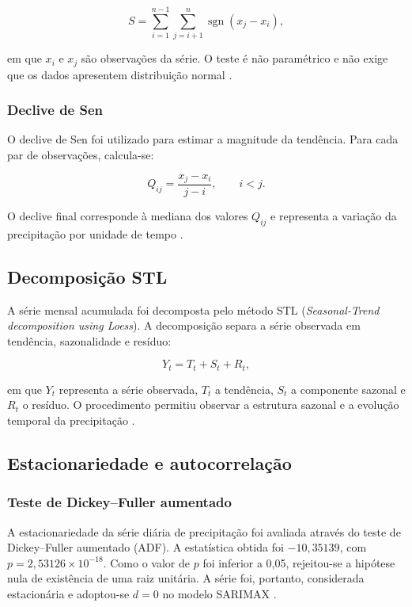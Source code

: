 \documentclass[9pt,twocolumn,twoside,english,portuguese]{opticajnl}
\begin{document}
\[
S=\sum_{i=1}^{n-1}\sum_{j=i+1}^{n}
\operatorname{sgn}(x_j-x_i),
\]

em que $x_i$ e $x_j$ são observações da série. O teste é não paramétrico e
não exige que os dados apresentem distribuição normal
\cite{mann1945nonparametric,kendall1975rank}.

\subsubsection{Declive de Sen}

O declive de Sen foi utilizado para estimar a magnitude da tendência. Para
cada par de observações, calcula-se:

\[
Q_{ij}=\frac{x_j-x_i}{j-i}, \qquad i<j.
\]

O declive final corresponde à mediana dos valores $Q_{ij}$ e representa a
variação da precipitação por unidade de tempo
\cite{sen1968estimates}.

\subsection{Decomposição STL}

A série mensal acumulada foi decomposta pelo método STL
(\textit{Seasonal-Trend decomposition using Loess}). A decomposição separa a
série observada em tendência, sazonalidade e resíduo:

\[
Y_t=T_t+S_t+R_t,
\]

em que $Y_t$ representa a série observada, $T_t$ a tendência, $S_t$ a
componente sazonal e $R_t$ o resíduo. O procedimento permitiu observar a
estrutura sazonal e a evolução temporal da precipitação
\cite{cleveland1990stl}.
\subsection{Estacionariedade e autocorrelação}

\subsubsection{Teste de Dickey--Fuller aumentado}

A estacionariedade da série diária de precipitação foi avaliada através do
teste de Dickey--Fuller aumentado (ADF). A estatística obtida foi
$-10{,}35139$, com $p=2{,}53126\times10^{-18}$. Como o valor de $p$ foi
inferior a 0,05, rejeitou-se a hipótese nula de existência de uma raiz
unitária. A série foi, portanto, considerada estacionária e adoptou-se
$d=0$ no modelo SARIMAX \cite{dickey1979distribution}.
\end{document}
